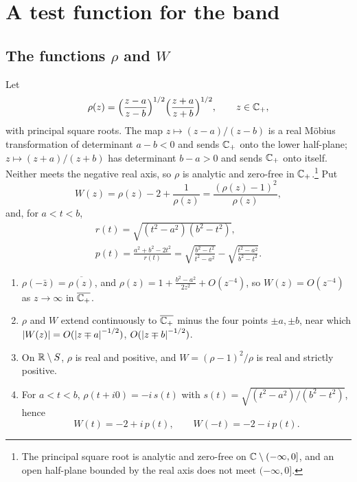 \section{A test function for the band}\label{sec:test}

\subsection{The functions $\rho$ and $W$}

Let
\[
\rho(z)=\Big(\frac{z-a}{z-b}\Big)^{1/2}\Big(\frac{z+a}{z+b}\Big)^{1/2},
\qquad z\in\mathbb C_{+},
\]
with principal square roots. The map $z\mapsto(z-a)/(z-b)$ is a real
M\"obius transformation of determinant $a-b<0$ and sends $\mathbb C_{+}$ onto the lower
half-plane; $z\mapsto(z+a)/(z+b)$ has determinant $b-a>0$ and sends $\mathbb C_{+}$ onto
itself. Neither meets the negative real axis, so $\rho$ is analytic and
zero-free in $\mathbb C_{+}$.\footnote{The principal square root is analytic and zero-free on $\mathbb C\setminus(-\infty,0]$, and an open half-plane bounded by the real axis does not meet $(-\infty,0]$.} Put
\begin{equation}\label{eq:W}
W(z)=\rho(z)-2+\frac1{\rho(z)}=\frac{(\rho(z)-1)^2}{\rho(z)} ,
\end{equation}
and, for $a<t<b$,
\begin{equation}\label{eq:p}
\begin{gathered}
r(t)=\sqrt{(t^2-a^2)(b^2-t^2)},\\
p(t)=\frac{a^2+b^2-2t^2}{r(t)}
=\sqrt{\frac{b^2-t^2}{t^2-a^2}}-\sqrt{\frac{t^2-a^2}{b^2-t^2}} .
\end{gathered}
\end{equation}

\begin{lemma}\label{lem:W}
\begin{enumerate}
\item[(i)] $\rho(-\bar z)=\overline{\rho(z)}$, and
$\rho(z)=1+\frac{b^2-a^2}{2z^2}+O(z^{-4})$, so $W(z)=O(z^{-4})$ as
$z\to\infty$ in $\overline{\mathbb C_{+}}$.
\item[(ii)] $\rho$ and $W$ extend continuously to $\overline{\mathbb C_{+}}$ minus the
four points $\pm a,\pm b$, near which $\left|W(z)\right|=O(\left|z\mp a\right|^{-1/2})$,
$O(\left|z\mp b\right|^{-1/2})$.
\item[(iii)] On $\mathbb R\setminus S$, $\rho$ is real and positive, and
$W=(\rho-1)^2/\rho$ is real and strictly positive.
\item[(iv)] For $a<t<b$, $\rho(t+i0)=-i\,s(t)$ with
$s(t)=\sqrt{(t^2-a^2)/(b^2-t^2)}$, hence
\[
W(t)=-2+i\,p(t),\qquad W(-t)=-2-i\,p(t).
\]
\end{enumerate}
\end{lemma}

